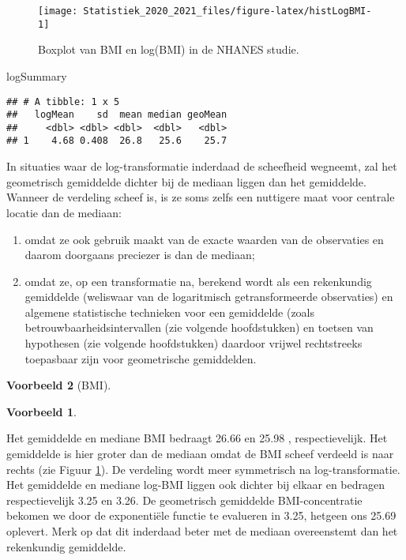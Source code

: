 \documentclass[
  12pt,dutch,coursenotes]{book}
\newenvironment{Shaded}{\begin{snugshade}}{\end{snugshade}}
\newcommand{\NormalTok}[1]{#1}
\theoremstyle{definition}
\theoremstyle{definition}
\newtheorem{example}{Voorbeeld}[chapter]
\theoremstyle{definition}
\theoremstyle{remark}
\begin{document}
\begin{figure}

{\centering \texttt{[image: Statistiek\_2020\_2021\_files/figure-latex/histLogBMI-1]} 

}

\caption{Boxplot van BMI en log(BMI) in de NHANES studie.}\label{fig:histLogBMI}
\end{figure}

\begin{Shaded}
\begin{Highlighting}[]
\NormalTok{logSummary}
\end{Highlighting}
\end{Shaded}

\begin{verbatim}
## # A tibble: 1 x 5
##   logMean    sd  mean median geoMean
##     <dbl> <dbl> <dbl>  <dbl>   <dbl>
## 1    4.68 0.408  26.8   25.6    25.7
\end{verbatim}

In situaties waar de log-transformatie inderdaad de scheefheid wegneemt, zal
het geometrisch gemiddelde dichter bij de mediaan liggen dan het gemiddelde.
Wanneer de verdeling scheef is, is ze soms zelfs een nuttigere maat voor centrale
locatie dan de mediaan:

\begin{enumerate}
\def\labelenumi{\arabic{enumi}.}
\item
  omdat ze ook gebruik maakt van de exacte waarden van de observaties en
  daarom doorgaans preciezer is dan de mediaan;
\item
  omdat ze, op een transformatie na, berekend wordt als een rekenkundig
  gemiddelde (weliswaar van de logaritmisch getransformeerde observaties) en
  algemene statistische technieken voor een gemiddelde (zoals
  betrouwbaarheidsintervallen (zie volgende hoofdstukken) en toetsen van hypothesen (zie volgende hoofdstukken) daardoor vrijwel rechtstreeks
  toepasbaar zijn voor geometrische gemiddelden.
\end{enumerate}

\begin{example}[BMI]
\begin{example}

\protect\hypertarget{exm:unnamed-chunk-100}{}{\label{exm:unnamed-chunk-100} \iffalse (BMI) \fi{} }

\end{example}
\end{example}

Het gemiddelde en mediane BMI bedraagt 26.66 en 25.98 , respectievelijk. Het gemiddelde is hier groter dan de mediaan omdat de BMI scheef verdeeld is naar rechts (zie Figuur \ref{fig:histLogBMI}). De verdeling wordt meer symmetrisch na log-transformatie. Het gemiddelde en mediane log-BMI liggen ook dichter bij elkaar en bedragen respectievelijk 3.25 en 3.26. De geometrisch gemiddelde BMI-concentratie bekomen we door de exponentiële functie te evalueren in 3.25, hetgeen ons 25.69 oplevert. Merk op dat dit inderdaad beter met de mediaan overeenstemt dan het rekenkundig gemiddelde.
\end{document}
